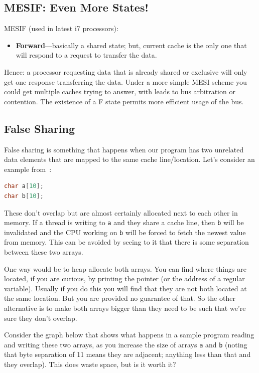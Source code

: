 \documentclass[a4paper]{report}
\begin{document}
\subsection*{MESIF: Even More States!}

    MESIF (used in latest i7 processors):
      \begin{itemize}
        \item {\bf Forward}---basically a shared state; but, current
          cache is the only one that will respond to a request to
          transfer the data.
      \end{itemize}

    Hence: a processor requesting data that is already shared or exclusive will
      only get one response transferring the data. Under a more simple MESI scheme you could get multiple caches trying to answer, with leads to bus arbitration or contention. The existence of a F state permits more efficient usage of the bus.
      
      
\subsection*{False Sharing}
False sharing is something that happens when our program has two unrelated data elements that are mapped to the same cache line/location. Let's consider an example from~\cite{falsesharing}:

\begin{lstlisting}[language=C]
char a[10];
char b[10];
\end{lstlisting}
These don't overlap but are almost certainly allocated next to each other in memory. If a thread is writing to \texttt{a} and they share a cache line, then \texttt{b} will be invalidated and the CPU working on \texttt{b} will be forced to fetch the newest value from memory. This can be avoided by seeing to it that there is some separation between these two arrays.

One way would be to heap allocate both arrays. You can find where things are located, if you are curious, by printing the pointer (or the address of a regular variable). Usually if you do this you will find that they are not both located at the same location. But you are provided no guarantee of that. So the other alternative is to make both arrays bigger than they need to be such that we're sure they don't overlap.

Consider the graph below that shows what happens in a sample program reading and writing these two arrays, as you increase the size of arrays \texttt{a} and \texttt{b} (noting that byte separation of 11 means they are adjacent; anything less than that and they overlap). This does waste space, but is it worth it?
\end{document}
